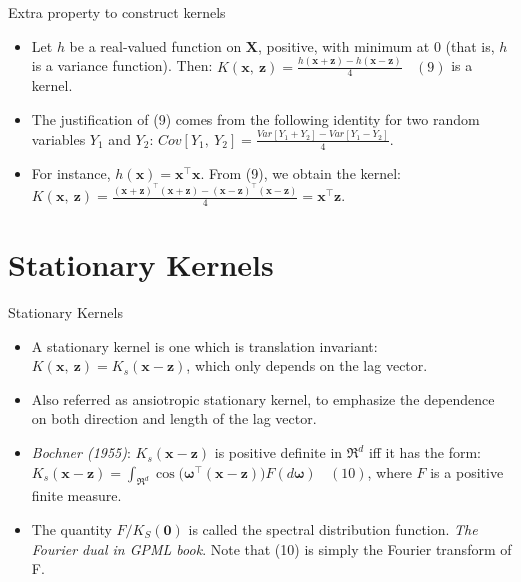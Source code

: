 \documentclass[
  ignorenonframetext,
]{beamer}
\begin{document}
\begin{frame}{Extra property to construct kernels}
\protect\hypertarget{extra-property-to-construct-kernels}{}
\begin{itemize}
\item
  Let \(h\) be a real-valued function on \(\pmb X\), positive, with
  minimum at \(0\) (that is, \(h\) is a variance function). Then:
  \(K(\pmb x,\ \pmb z) = \frac {h(\pmb x + \pmb z) - h(\pmb x - \pmb z)} 4 \ \ \ \ (9)\)
  is a kernel.
\item
  The justification of (9) comes from the following identity for two
  random variables \(Y_1\) and \(Y_2\):
  \(Cov[Y_1,\ Y_2] = \frac {Var[Y_1 + Y_2] - Var[Y_1 - Y_2]} 4\).
\item
  For instance, \(h(\pmb x) = \pmb x^{\top} \pmb x\). From (9), we
  obtain the kernel:
  \(K(\pmb x,\ \pmb z) = \frac {(\pmb x + \pmb z)^{\top} (\pmb x + \pmb z) - (\pmb x - \pmb z)^{\top} (\pmb x - \pmb z)} 4 = \pmb x^{\top} \pmb z\).
\end{itemize}
\end{frame}

\hypertarget{stationary-kernels}{%
\section{Stationary Kernels}\label{stationary-kernels}}

\begin{frame}{Stationary Kernels}
\begin{itemize}
\item
  A stationary kernel is one which is translation invariant:
  \(K(\pmb x,\ \pmb z) = K_s (\pmb x - \pmb z)\), which only depends on
  the lag vector.
\item
  Also referred as ansiotropic stationary kernel, to emphasize the
  dependence on both direction and length of the lag vector.
\item
  \emph{Bochner (1955)}: \(K_s (\pmb x - \pmb z)\) is positive definite
  in \(\mathfrak R^d\) iff it has the form:
  \(K_s (\pmb x - \pmb z) = \int _{\mathfrak R^d} \cos \big(\pmb \omega ^{\top} (\pmb x - \pmb z)\big) F(d\pmb \omega) \ \ \ \ (10)\),
  where \(F\) is a positive finite measure.
\item
  The quantity \(F / K_S(\pmb 0)\) is called the spectral distribution
  function. \emph{The Fourier dual in GPML book}. Note that (10) is
  simply the Fourier transform of F.
\end{itemize}
\end{frame}
\end{document}
